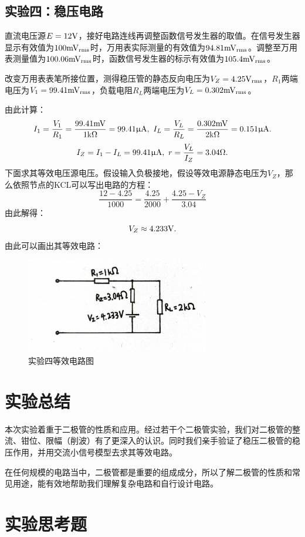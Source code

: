 \documentclass[a4paper,11pt,UTF8]{ctexart}
\begin{document}
\subsection{实验四：稳压电路}
直流电压源$E=12\mathrm{V}$，接好电路连线再调整函数信号发生器的取值。在信号发生器显示有效值为$100\mathrm{mV_{rms}}$时，万用表实际测量的有效值为$94.81\mathrm{mV_{rms}}$。调整至万用表测量值为$100.06\mathrm{mV_{rms}}$时，函数信号发生器的标示有效值为$105.4\mathrm{mV_{rms}}$。
\par 改变万用表表笔所接位置，测得稳压管的静态反向电压为$V_Z=4.25\mathrm{V_{rms}}$，$R_1$两端电压为$V_1=99.41\mathrm{mV_{rms}}$，负载电阻$R_L$两端电压为$V_L=0.302\mathrm{mV_{rms}}$。
\par 由此计算：
\[ I_1=\frac{V_1}{R_1}=\frac{99.41\mathrm{mV}}{1\mathrm{k}\Omega}=99.41\mathrm{\upmu A},~
   I_L=\frac{V_L}{R_L}=\frac{0.302\mathrm{mV}}{2\mathrm{k}\Omega}=0.151\mathrm{\upmu A}.
   \]
\[
  I_Z=I_1-I_L=99.41\mathrm{\upmu A},~r=\frac{V_L}{I_Z}=3.04\Omega.
\]
下面求其等效电压源电压。假设输入负极接地，假设等效电源静态电压为$V_Z$，那么依照节点的KCL可以写出电路的方程：
\[ \frac{12-4.25}{1000}=\frac{4.25}{2000}+\frac{4.25-V_Z}{3.04} \]
由此解得：
\[ V_Z\approx4.233\mathrm{V}. \]
由此可以画出其等效电路：
\begin{figure}[H]
 \centering
 \includegraphics[width=8cm]{Exp4Circuit}
 \caption{实验四等效电路图}
 \label{fig:Exp4Circuit}
\end{figure}

\section{实验总结}
本次实验着重于二极管的性质和应用。经过若干个二极管实验，我们对二极管的整流、钳位、限幅（削波）有了更深入的认识。同时我们亲手验证了稳压二极管的稳压作用，并用交流小信号模型去求其等效电路。
\par 在任何规模的电路当中，二极管都是重要的组成成分，所以了解二极管的性质和常见用途，能有效地帮助我们理解复杂电路和自行设计电路。

\section{实验思考题}
\end{document}
